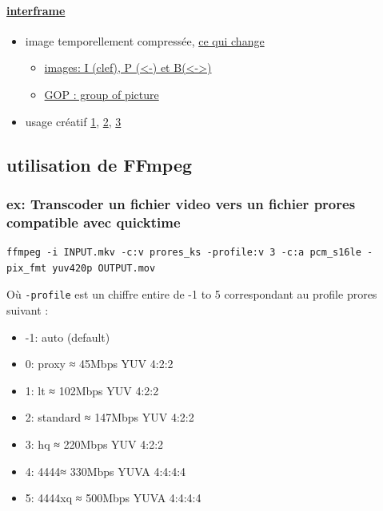 \documentclass[
]{book}
\providecommand{\tightlist}{%
  \setlength{\itemsep}{0pt}\setlength{\parskip}{0pt}}
\begin{document}
\hypertarget{interframe}{%
\paragraph{\texorpdfstring{\href{https://en.wikipedia.org/wiki/Inter_frame}{interframe}}{interframe}}\label{interframe}}

\begin{itemize}
\tightlist
\item
  image temporellement compressée, \href{http://dvd-hq.info/data_compression_3.php}{ce qui change}

  \begin{itemize}
  \tightlist
  \item
    \href{https://en.wikipedia.org/wiki/Video_compression_picture_types}{images: I (clef), P (\textless-) et B(\textless-\textgreater)}
  \item
    \href{https://en.wikipedia.org/wiki/Inter_frame\#/media/File:IPB_images_sequence.png}{GOP : group of picture}
  \end{itemize}
\item
  usage créatif \href{https://www.youtube.com/watch?v=rMSsw4CZvKg}{1}, \href{https://www.youtube.com/watch?v=rSmEOk5AiN0}{2}, \href{https://www.youtube.com/watch?v=dNa0-xrKi3Q}{3}
\end{itemize}

\hypertarget{utilisation-de-ffmpeg}{%
\subsection{utilisation de FFmpeg}\label{utilisation-de-ffmpeg}}

\hypertarget{ex-transcoder-un-fichier-video-vers-un-fichier-prores-compatible-avec-quicktime}{%
\subsubsection{ex: Transcoder un fichier video vers un fichier prores compatible avec quicktime}\label{ex-transcoder-un-fichier-video-vers-un-fichier-prores-compatible-avec-quicktime}}

\begin{verbatim}
ffmpeg -i INPUT.mkv -c:v prores_ks -profile:v 3 -c:a pcm_s16le -pix_fmt yuv420p OUTPUT.mov
\end{verbatim}

Où \texttt{-profile} est un chiffre entire de -1 to 5 correspondant au profile prores suivant :

\begin{itemize}
\tightlist
\item
  -1: auto (default)
\item
  0: proxy ≈ 45Mbps YUV 4:2:2
\item
  1: lt ≈ 102Mbps YUV 4:2:2
\item
  2: standard ≈ 147Mbps YUV 4:2:2
\item
  3: hq ≈ 220Mbps YUV 4:2:2
\item
  4: 4444≈ 330Mbps YUVA 4:4:4:4
\item
  5: 4444xq ≈ 500Mbps YUVA 4:4:4:4
\end{itemize}
\end{document}
